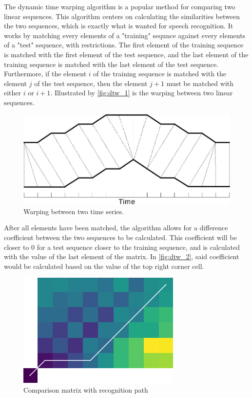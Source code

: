 \documentclass[%
  report,%
  10pt,%
  a4paper,%
  fleqn,%
  oneside,%
  sumario = tradicional,%
  chapter = TITLE,%
  section = TITLE,%
]{abntex2}
\begin{document}
The dynamic time warping algorithm is a popular method for comparing two linear sequences.
This algorithm centers on calculating the similarities between the two sequences, which is exactly what is wanted for speech recognition.
It works by matching every elements of a "training" sequnce against every elements of a "test" sequence, with restrictions.
The first element of the training sequence is matched with the first element of the test sequence, and the last element of the training sequence is matched with the last element of the test sequence.
Furthermore, if the element $i$ of the training sequence is matched with the element $j$ of the test sequence, then the element $j + 1$ must be matched with either $i$ or $i + 1$.
Illustrated by \autoref{fig:dtw_1} is the warping between two linear sequences.

\begin{figure}[H]
  \centering
  \caption{Warping between two time series.}
  \label{fig:dtw_1}
  \includegraphics[width = 0.5\columnwidth]{./Figuras/dtw_1}
\end{figure}

After all elements have been matched, the algorithm allows for a difference coefficient between the two sequences to be calculated.
This coefficient will be closer to 0 for a test sequence closer to the training sequence, and is calculated with the value of the last element of the matrix.
In \autoref{fig:dtw_2}, said coefficient would be calculated based on the value of the top right corner cell.

\begin{figure}[H]
  \centering
  \caption{Comparison matrix with recognition path}
  \label{fig:dtw_2}
  \includegraphics[width = 0.5\columnwidth]{./Figuras/dtw_2}
\end{figure}
\end{document}
